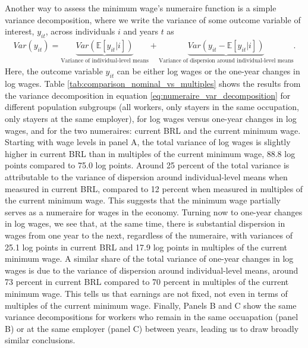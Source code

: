 Another way to assess the minimum wage's numeraire function is a simple variance decomposition, where we write the variance of some outcome variable of interest, $y_{it}$, across individuals $i$ and years $t$ as
%
\begin{align}
  Var(y_{it}) = \underbrace{Var(\mathbb{E}[y_{it} | i])}_{\text{Variance of individual-level means}} + \underbrace{Var(y_{it} - \mathbb{E}[y_{it} | i])}_{\text{Variance of dispersion around individual-level means}}. \label{eq:numeraire_var_decomposition}
\end{align}
%
Here, the outcome variable $y_{it}$ can be either log wages or the one-year changes in log wages. Table \ref{tab:comparison_nominal_vs_multiples} shows the results from the variance decomposition in equation \eqref{eq:numeraire_var_decomposition} for different population subgroups (all workers, only stayers in the same occupation, only stayers at the same employer), for log wages versus one-year changes in log wages, and for the two numeraires: current BRL and the current minimum wage. Starting with wage levels in panel A, the total variance of log wages is slightly higher in current BRL than in multiples of the current minimum wage, 88.8 log points compared to 75.0 log points. Around 25 percent of the total variance is attributable to the variance of dispersion around individual-level means when measured in current BRL, compared to 12 percent when measured in multiples of the current minimum wage. This suggests that the minimum wage partially serves as a numeraire for wages in the economy. Turning now to one-year changes in log wages, we see that, at the same time, there is substantial dispersion in wages from one year to the next, regardless of the numeraire, with variances of 25.1 log points in current BRL and 17.9 log points in multiples of the current minimum wage. A similar share of the total variance of one-year changes in log wages is due to the variance of dispersion around individual-level means, around 73 percent in current BRL compared to 70 percent in multiples of the current minimum wage. This tells us that earnings are not fixed, not even in terms of multiples of the current minimum wage. Finally, Panels B and C show the same variance decompositions for workers who remain in the same occuapation (panel B) or at the same employer (panel C) between years, leading us to draw broadly similar conclusions.


